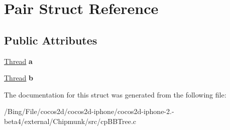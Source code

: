 \hypertarget{struct_pair}{\section{Pair Struct Reference}
\label{struct_pair}
}
\subsection*{Public Attributes}
\begin{DoxyCompactItemize}
\item 
\hypertarget{struct_pair_afe50465c00afde658d9c568f16c2f8b2}{\hyperlink{struct_thread}{Thread} {\bfseries a}}\label{struct_pair_afe50465c00afde658d9c568f16c2f8b2}

\item 
\hypertarget{struct_pair_aa55685b3b1ca80f4113c11c9d9a67c45}{\hyperlink{struct_thread}{Thread} {\bfseries b}}\label{struct_pair_aa55685b3b1ca80f4113c11c9d9a67c45}

\end{DoxyCompactItemize}


The documentation for this struct was generated from the following file\-:\begin{DoxyCompactItemize}
\item 
/\-Bing/\-File/cocos2d/cocos2d-\/iphone/cocos2d-\/iphone-\/2.-\/beta4/external/\-Chipmunk/src/cp\-B\-B\-Tree.\-c\end{DoxyCompactItemize}
